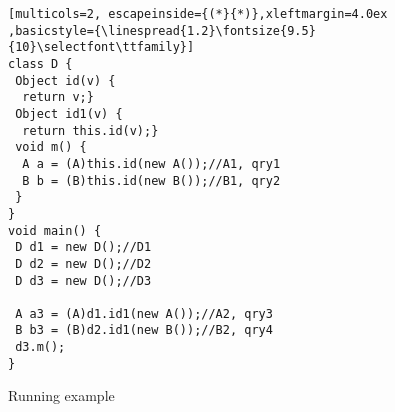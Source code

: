

\begin{figure}[t]
\begin{lstlisting}[multicols=2, escapeinside={(*}{*)},xleftmargin=4.0ex ,basicstyle={\linespread{1.2}\fontsize{9.5}{10}\selectfont\ttfamily}]
class D {
 Object id(v) {
  return v;}
 Object id1(v) {
  return this.id(v);}
 void m() {
  A a = (A)this.id(new A());//A1, qry1
  B b = (B)this.id(new B());//B1, qry2
 }
}
void main() {
 D d1 = new D();//D1
 D d2 = new D();//D2
 D d3 = new D();//D3 

 A a3 = (A)d1.id1(new A());//A2, qry3 
 B b3 = (B)d2.id1(new B());//B2, qry4
 d3.m();
}
\end{lstlisting}
\vspace{-15pt}
\caption{Running example}
\vspace{-15pt}
\label{simulation:example}
\end{figure}


